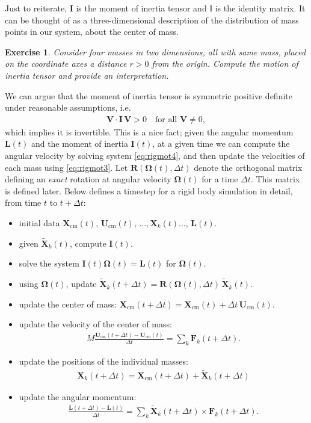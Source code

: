 \documentclass[10pt]{article}
\newtheorem{myexer}{Exercise}
\newcommand{\bs}[1]{{\boldsymbol #1}}
\begin{document}
Just to reiterate, ${\bs I}$ is the moment of inertia tensor and $\mathbb{I}$ is the identity matrix.  It can be thought of as a three-dimensional description of the distribution of mass points in our system, about the center of mass.
\begin{myexer}
Consider four masses in two dimensions, all with same mass, placed on the coordinate axes a distance $r > 0$ from the origin.  Compute the motion of inertia tensor and provide an interpretation.
\end{myexer}
We can argue that the moment of inertia tensor is symmetric positive definite under reasonable assumptions, i.e.
\begin{align*}
{\bs V} \cdot {\bs I}\, {\bs V} > 0 \quad \text{for all }{\bs V} \neq 0,
\end{align*}
which implies it is invertible.  This is a nice fact; given the angular momentum ${\bs L}(t)$ and the moment of inertia ${\bs I}(t)$, at a given time we can compute the angular velocity by solving system \eqref{eq:rigmot4}, and then update the velocities of each mass using \eqref{eq:rigmot3}.  Let ${\bs R}({\bs \Omega}(t),\Delta t)$ denote the orthogonal matrix defining an {\em exact} rotation at angular velocity ${\bs \Omega}(t)$ for a time $\Delta t$.  This matrix is defined later.  Below defines a timestep for a rigid body simulation in detail, from time $t$ to $t + \Delta t$:
\begin{itemize}
\item initial data ${\bs X}_\text{cm}(t)$, ${\bs U}_\text{cm}(t)$, $\ldots, {\bs X}_k(t) \ldots$, ${\bs L}(t)$.
\item given $\tilde{{\bs X}}_k(t)$, compute ${\bs I}(t)$.
\item solve the system ${\bs I}(t){\bs \Omega}(t) = {\bs L}(t)$ for ${\bs \Omega}(t)$.
\item using ${\bs \Omega}(t)$, update $\tilde{{\bs X}}_k(t + \Delta t) = {\bs R}({\bs \Omega}(t), \Delta t)\, \tilde{{\bs X}}_k(t)$.
\item update the center of mass: ${\bs X}_\text{cm}(t + \Delta t) = {\bs X}_\text{cm}(t) + \Delta t \, {\bs U}_\text{cm}(t)$.
\item update the velocity of the center of mass:
\begin{align*}
M \frac{{\bs U}_\text{cm}(t + \Delta t) - {\bs U}_\text{cm}(t)}{\Delta t} = \sum_k {\bs F}_k(t + \Delta t).
\end{align*}
\item update the positions of the individual masses:
\begin{align*}
{\bs X}_k(t+\Delta t) = {\bs X}_\text{cm}(t + \Delta t) + \tilde{{\bs X}}_k(t+\Delta t)
\end{align*}
\item update the angular momentum:
\begin{align*}
\frac{{\bs L}(t + \Delta t) - {\bs L}(t)}{\Delta t} = \sum_k \tilde{{\bs X}}_k(t + \Delta t) \times {\bs F}_k(t + \Delta t).
\end{align*}
\end{itemize}
\end{document}
